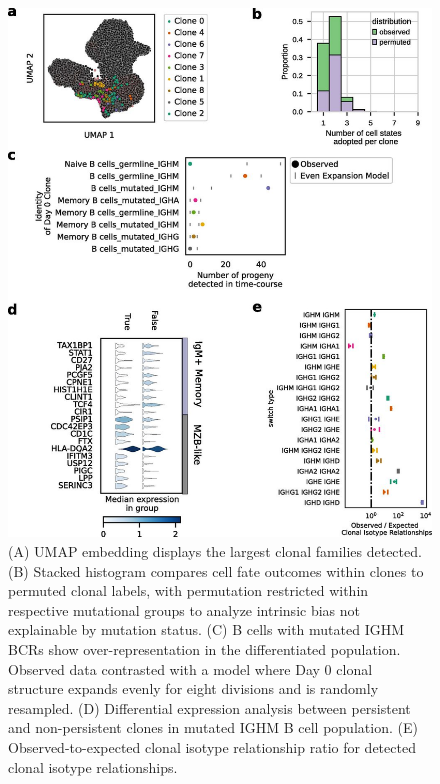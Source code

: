 \begin{figure}[hbt!]
\centering
\includegraphics[width=14cm, keepaspectratio]{figs/paper2/fig3_bcd.jpg}
\caption[Clonal families allow inference of intrinsic proliferative ability, limited clonal fate outcomes, map of class-switching \textit{in vitro}.]{(A) UMAP embedding displays the largest clonal families detected. (B) Stacked histogram compares cell fate outcomes within clones to permuted clonal labels, with permutation restricted within respective mutational groups to analyze intrinsic bias not explainable by mutation status. (C) B cells with mutated IGHM BCRs show over-representation in the differentiated population. Observed data contrasted with a model where Day 0 clonal structure expands evenly for eight divisions and is randomly resampled. (D) Differential expression analysis between persistent and non-persistent clones in mutated IGHM B cell population. (E) Observed-to-expected clonal isotype relationship ratio for detected clonal isotype relationships.}
\label{fig:paper2_fig_3}
\end{figure}

